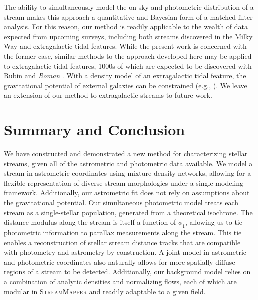 \documentclass[twocolumn, linenumbers]{aastex631}
\newcommand{\code}[1]{\textsc{#1}}
\newcommand{\package}[1]{\code{#1}}
\begin{document}
        The ability to simultaneously model the on-sky and photometric
        distribution of a stream makes this approach a quantitative and Bayesian
        form of a matched filter analysis. For this reason, our method is
        readily applicable to the wealth of data expected from upcoming surveys,
        including both streams discovered in the Milky Way and extragalactic
        tidal features. While the present work is concerned with the former
        case, similar methods to the approach developed here may be applied to
        extragalactic tidal features, 1000s of which are expected to be
        discovered with Rubin \citep{Ivezic+2019} and \textit{Roman}
        \citep{Spergel+2013}. With a density model of an extragalactic tidal
        feature, the gravitational potential of external galaxies can be
        constrained (e.g., \citealt{Fardal+2013, Pearson+2022, Nibauer+2023}).
        We leave an extension of our method to extragalactic streams to future
        work.
        



\section{Summary and Conclusion} \label{sec:conclusions}

    We have constructed and demonstrated a new method for characterizing stellar
    streams, given all of the astrometric and photometric data available. We
    model a stream in astrometric coordinates using mixture density networks,
    allowing for a flexible representation of diverse stream morphologies under
    a single modeling framework. Additionally, our astrometric fit does not rely
    on assumptions about the gravitational potential. Our simultaneous
    photometric model treats each stream as a single-stellar population,
    generated from a theoretical isochrone. The distance modulus along the
    stream is itself a function of $\phi_1$, allowing us to tie photometric
    information to parallax measurements along the stream. This tie enables a
    reconstruction of stellar stream distance tracks that are compatible with
    photometry and astrometry by construction. A joint model in astrometric and
    photometric coordinates also naturally allows for more spatially diffuse
    regions of a stream to be detected. Additionally, our background model
    relies on a combination of analytic densities and normalizing flows, each of
    which are modular in \package{StreamMapper} and readily adaptable to a given
    field. 
\end{document}
